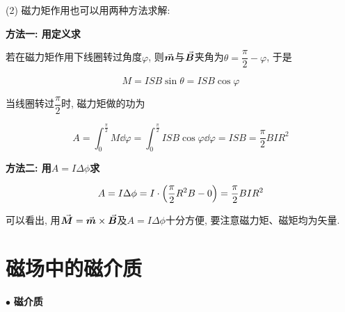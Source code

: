 \begin{example}
\begin{solution}
		(2) 磁力矩作用也可以用两种方法求解: 
		
		\textbf{方法一: 用定义求}
		
		若在磁力矩作用下线圈转过角度$\varphi$, 则$\va*{m}$与$\va*{B}$夹角为$\theta = \dfrac{\pi}{2} - \varphi$, 于是
		
		\begin{equation*}
			M = ISB \sin\theta = ISB\cos\varphi
		\end{equation*}
		
		当线圈转过$\dfrac{\pi}{2}$时, 磁力矩做的功为
		
		\begin{equation*}
			A = \int_{0}^{\frac{\pi}{2}} M \dd{\varphi} = \int_{0}^{\frac{\pi}{2}} ISB \cos\varphi \dd{\varphi} = ISB = \dfrac{\pi}{2} BIR^2
		\end{equation*}
		
		\textbf{方法二: 用$A = I \Delta \phi$求}
		
		\begin{equation*}
			A = I\Delta \phi = I \cdot \qty(\dfrac{\pi}{2} R^2 B - 0) = \dfrac{\pi}{2} BIR^2
		\end{equation*}
		
		可以看出, 用$\va*{M} = \va*{m} \times \va*{B}$及$A = I \Delta \phi$十分方便, 要注意磁力矩、磁矩均为矢量. 
		
	\end{solution}
	
\end{example}

\section{磁场中的磁介质}\label{8.6}

$\bullet$ \textbf{磁介质}

